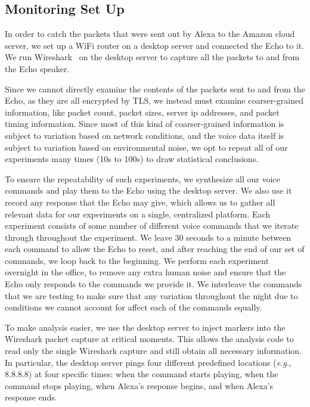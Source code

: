 \subsection{Monitoring Set Up}
\label{sec:expr:set-up}

In order to catch the packets that were sent out by Alexa to the Amazon cloud server, we set up a WiFi router on a desktop server and connected the Echo to it. We run Wireshark~\cite{wireshark} on the desktop server to capture all the packets to and from the Echo speaker.

Since we cannot directly examine the contents of the packets sent to and from the Echo, as they are all encrypted by TLS, we instead must examine coarser-grained information, like packet count, packet sizes, server ip addresses, and packet timing information. Since most of this kind of coarser-grained information is subject to variation based on network conditions, and the voice data itself is subject to variation based on environmental noise, we opt to repeat all of our experiments many times (10s to 100s) to draw statistical conclusions. 

To ensure the repeatability of such experiments, we synthesize all our voice commands and play them to the Echo using the desktop server. We also use it record any response that the Echo may give, which allows us to gather all relevant data for our experiments on a single, centralized platform. Each experiment consists of some number of different voice commands that we iterate through throughout the experiment. We leave 30 seconds to a minute between each command to allow the Echo to reset, and after reaching the end of our set of commands, we loop back to the beginning. We perform each experiment overnight in the office, to remove any extra human noise and ensure that the Echo only responds to the commands we provide it. We interleave the commands that we are testing to make sure that any variation throughout the night due to conditions we cannot account for affect each of the commands equally.

To make analysis easier, we use the desktop server to inject markers into the Wireshark packet capture at critical moments. This allows the analysis code to read only the single Wireshark capture and still obtain all necessary information. In particular, the desktop server pings four different predefined locations (\textit{e.g.}, 8.8.8.8) at four specific times: when the command starts playing, when the command stops playing, when Alexa's response begins, and when Alexa's response ends.

